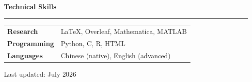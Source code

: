 \documentclass[10pt,oneside]{article}
\newcommand{\sectionheading}[1]{%
  \vspace{0.35cm}
  {\Large\bfseries\color{AcademicNavy}#1}\par
  \vspace{0.08cm}
  {\color{AcademicGold}\rule{\textwidth}{1.1pt}}
  \vspace{0.12cm}
}
\begin{document}
\sectionheading{Technical Skills}
\begin{longtable}{@{}p{} p{}@{}}
  \textcolor{AcademicBlue}{\textbf{Research}} &
    \LaTeX, Overleaf, Mathematica, MATLAB\\[0.18cm]
  \textcolor{AcademicBlue}{\textbf{Programming}} &
    Python, C, R, HTML\\[0.18cm]
  \textcolor{AcademicBlue}{\textbf{Languages}} &
    Chinese (native), English (advanced)
\end{longtable}

\vfill
{\small\color{AcademicMuted}Last updated: July 2026}
\end{document}

